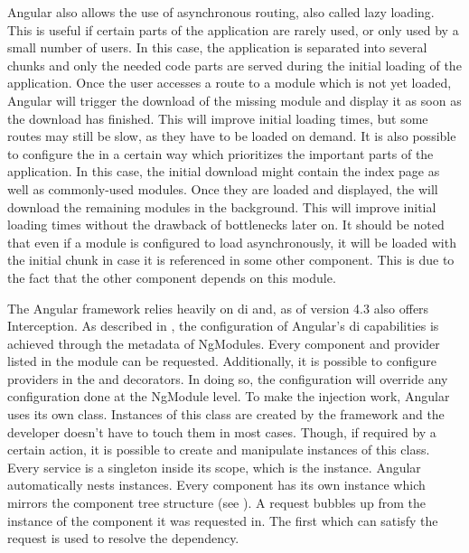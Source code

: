 Angular also allows the use of asynchronous routing, also called lazy loading. This is useful if certain parts of the application are rarely used, or only used by a small number of users. In this case, the application is separated into several chunks and only the needed code parts are served during the initial loading of the application. Once the user accesses a route to a module which is not yet loaded, Angular will trigger the download of the missing module and display it as soon as the download has finished. This will improve initial loading times, but some routes may still be slow, as they have to be loaded on demand. It is also possible to configure the  in a certain way which prioritizes the important parts of the application. In this case, the initial download might contain the index page as well as commonly-used modules. Once they are loaded and displayed, the  will download the remaining modules in the background. This will improve initial loading times without the drawback of bottlenecks later on. It should be noted that even if a module is configured to load asynchronously, it will be loaded with the initial chunk in case it is referenced in some other component. This is due to the fact that the other component depends on this module.


The Angular framework relies heavily on \gls{di} and, as of version 4.3 \cite{interceptorAngularVersion} also offers Interception. As described in , the configuration of Angular's \gls{di} capabilities is achieved through the metadata of NgModules. Every component and provider listed in the module can be requested. Additionally, it is possible to configure providers in the  and  decorators. In doing so, the configuration will override any configuration done at the NgModule level. To make the injection work, Angular uses its own  class. Instances of this class are created by the framework and the developer doesn't have to touch them in most cases. Though, if required by a certain action, it is possible to create and manipulate instances of this class. Every service is a singleton inside its scope, which is the  instance. Angular automatically nests  instances. Every component has its own  instance which mirrors the component tree structure (see ). A request bubbles up from the  instance of the component it was requested in. The first  which can satisfy the request is used to resolve the dependency.


